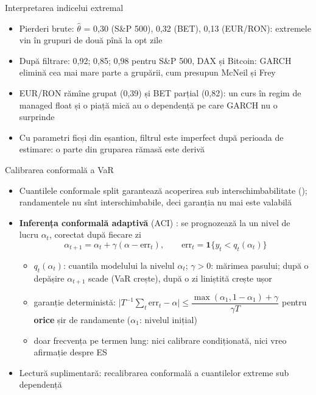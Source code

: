 \begin{frame}{Interpretarea indicelui extremal}
\itemsize{\small}
\begin{itemize}
    \item Pierderi brute: $\hat\theta$ = 0{,}30 (S\&P 500), 0{,}32 (BET), 0{,}13 (EUR/RON): extremele vin în grupuri de două pînă la opt zile
    \item După filtrare: 0{,}92; 0{,}85; 0{,}98 pentru S\&P 500, DAX și Bitcoin: GARCH elimină cea mai mare parte a grupării, cum presupun McNeil și Frey
    \item EUR/RON rămîne grupat (0{,}39) și BET parțial (0{,}82): un curs în regim de managed float și o piață mică au o dependență pe care GARCH nu o surprinde
    \item Cu parametri ficși din eșantion, filtrul este imperfect după perioada de estimare: o parte din gruparea rămasă este derivă
\end{itemize}
\end{frame}

\begin{frame}{Calibrarea conformală a VaR}
\itemsize{\small}
\begin{itemize}
    \item Cuantilele conformale split garantează acoperirea sub interschimbabilitate (); randamentele nu sînt interschimbabile, deci garanția nu mai este valabilă
    \item \textbf{Inferența conformală adaptivă} (ACI) : se prognozează la un nivel de lucru $\alpha_t$, corectat după fiecare zi
    \[ \alpha_{t+1} = \alpha_t + \gamma(\alpha - \mathrm{err}_t), \qquad \mathrm{err}_t = \mathbf 1\{y_t < q_t(\alpha_t)\} \]
    \begin{itemize}
        \item $q_t(\alpha_t)$: cuantila modelului la nivelul $\alpha_t$; $\gamma > 0$: mărimea pasului; după o depășire $\alpha_{t+1}$ scade (VaR crește), după o zi liniștită crește ușor
        \item garanție deterministă: $\big|T^{-1}\sum_t\mathrm{err}_t - \alpha\big| \le \dfrac{\max(\alpha_1, 1 - \alpha_1) + \gamma}{\gamma T}$ pentru \textbf{orice} șir de randamente ($\alpha_1$: nivelul inițial)
        \item doar frecvența pe termen lung: nici calibrare condiționată, nici vreo afirmație despre ES
    \end{itemize}
    \item Lectură suplimentară: recalibrarea conformală a cuantilelor extreme sub dependență 
\end{itemize}
\end{frame}

